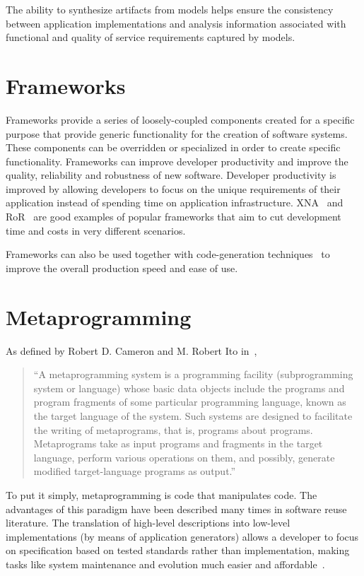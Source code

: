 The ability to synthesize artifacts from models helps ensure the consistency between application implementations and analysis information associated with functional and quality of service requirements captured by models.

\section{Frameworks}\label{sec:frameworks}

Frameworks provide a series of loosely-coupled components created for a specific purpose that provide generic functionality for the creation of software systems. These components can be overridden or specialized in order to create specific functionality. Frameworks can improve developer productivity and improve the quality, reliability and robustness of new software.  Developer productivity is improved by allowing developers to focus on the unique requirements of their application instead of spending time on application infrastructure. XNA~\cite{xna} and RoR~\cite{rubyonrails} are good examples of popular frameworks that aim to cut development time and costs in very different scenarios.

Frameworks can also be used together with code-generation techniques~\cite{DH04, rails_generators} to improve the overall production speed and ease of use.

\section{Metaprogramming}\label{sec:metaprogramming}

As defined by Robert D. Cameron and M. Robert Ito in~\cite{CI84},

\begin{quote}
 ``A metaprogramming system is a programming facility (subprogramming system or language) whose basic data objects include the programs and program fragments of some particular programming language, known as the target language of the system. Such systems are designed to facilitate the writing of metaprograms, that is, programs about programs. Metaprograms take as input programs and fragments in the target language, perform various operations on them, and possibly, generate modified target-language programs as output.''
\end{quote}

To put it simply, metaprogramming is code that manipulates code. The advantages of this paradigm have been described many times in software reuse literature. The translation of high-level descriptions into low-level implementations (by means of application generators) allows a developer to focus on specification based on tested standards rather than implementation, making tasks like system maintenance and evolution much easier and affordable~\cite{Bas87, Cle88}. %

